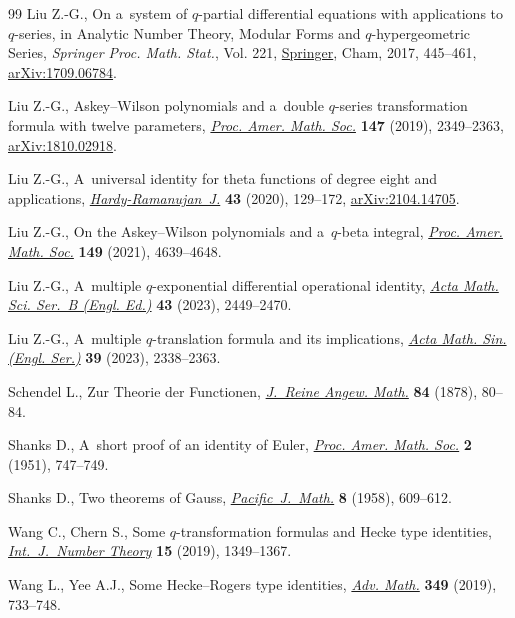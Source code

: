 \documentclass[10pt,a4paper]{amsart}
\numberwithin{equation}{section}
\begin{document}
\begin{thebibliography}{99}
Liu Z.-G., On a~system of {$q$}-partial differential equations with applications
 to {$q$}-series, in Analytic Number Theory, Modular Forms and
 {$q$}-hypergeometric Series, \textit{Springer Proc. Math. Stat.}, Vol. 221,
 \href{https://doi.org/10.1007/978-3-319-68376-8_2}{Springer}, Cham, 2017, 445--461, \href{https://arxiv.org/abs/1709.06784}{arXiv:1709.06784}.

Liu Z.-G., {A}skey--{W}ilson polynomials and a~double {$q$}-series
 transformation formula with twelve parameters, \href{https://doi.org/10.1090/proc/14411}{\textit{Proc. Amer. Math.
 Soc.}} \textbf{147} (2019), 2349--2363, \href{https://arxiv.org/abs/1810.02918}{arXiv:1810.02918}.

Liu Z.-G., A~universal identity for theta functions of degree eight and
 applications, \href{https://doi.org/10.46298/hrj.2021.7432}{\textit{Hardy-Ramanujan~J.}} \textbf{43} (2020), 129--172,
 \href{https://arxiv.org/abs/2104.14705}{arXiv:2104.14705}.

Liu Z.-G., On the {A}skey--{W}ilson polynomials and a~{$q$}-beta integral,
 \href{https://doi.org/10.1090/proc/15584}{\textit{Proc. Amer. Math. Soc.}} \textbf{149} (2021), 4639--4648.

Liu Z.-G., A~multiple {$q$}-exponential differential operational identity,
 \href{https://doi.org/10.1007/s10473-023-0608-3}{\textit{Acta Math. Sci. Ser.~B (Engl. Ed.)}} \textbf{43} (2023), 2449--2470.

Liu Z.-G., A~multiple {$q$}-translation formula and its implications,
 \href{https://doi.org/10.1007/s10114-023-2237-0}{\textit{Acta Math. Sin. (Engl. Ser.)}} \textbf{39} (2023), 2338--2363.

Schendel L., Zur {T}heorie der {F}unctionen, \href{https://doi.org/10.1515/crelle-1878-18788406}{\textit{J.~Reine Angew. Math.}}
 \textbf{84} (1878), 80--84.

Shanks D., A~short proof of an identity of {E}uler, \href{https://doi.org/10.2307/2032076}{\textit{Proc. Amer. Math.
 Soc.}} \textbf{2} (1951), 747--749.

Shanks D., Two theorems of {G}auss, \href{https://doi.org/10.2140/pjm.1958.8.609}{\textit{Pacific~J.~Math.}} \textbf{8}
 (1958), 609--612.

Wang C., Chern S., Some {$q$}-transformation formulas and {H}ecke type
 identities, \href{https://doi.org/10.1142/S1793042119500751}{\textit{Int.~J.~Number Theory}} \textbf{15} (2019), 1349--1367.

Wang L., Yee A.J., Some {H}ecke--{R}ogers type identities, \href{https://doi.org/10.1016/j.aim.2019.04.015}{\textit{Adv. Math.}}
 \textbf{349} (2019), 733--748.

\end{thebibliography}
\end{document}

